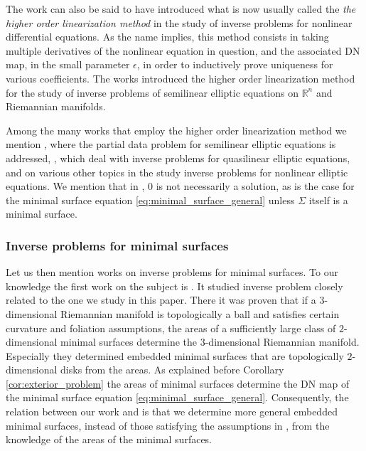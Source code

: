 \documentclass[12pt]{amsart}
\def\R{\mathbb R}
\theoremstyle{definition}
\theoremstyle{remark}
\begin{document}
The work \cite{kurylev2018inverse} can also be said to have introduced what is now usually called the \emph{the higher order linearization method} in the study of inverse problems for nonlinear differential equations. As the name implies, this method consists in taking multiple derivatives of the nonlinear equation in question, and the associated DN map, in the small parameter $\epsilon$, in order to inductively prove uniqueness for various coefficients. The works \cite{FO19,LLLS2019inverse, feizmohammadi2023inverse} introduced the higher order linearization method for the study of inverse problems of semilinear elliptic equations on $\R^n$ and Riemannian manifolds. 


Among the many works that employ the higher order linearization method we mention  \cite{MR4052205, LLLS2021b}, where the partial data problem for semilinear elliptic equations is addressed, \cite{CFKKU, kian2020partial, CaNaVa, Carstea2020, CaKa, CaFe1, CaFe2, CaGhNa, CaGhUh}, which deal with inverse problems for quasilinear elliptic equations, and \cite{lai2020partial, liimatainen2022inverse, liimatainen2022uniqueness, harrach2022simultaneous, salo2022inverse} on various other topics in the study inverse problems for nonlinear elliptic equations. We mention that in \cite{liimatainen2022uniqueness}, $0$ is not necessarily a solution, as is the case for the minimal surface equation \eqref{eq:minimal_surface_general} unless $\Sigma$ itself is a minimal surface.

\subsubsection{Inverse problems for minimal surfaces}
Let us then mention works on inverse problems for minimal surfaces. To our knowledge the first work on the subject is \cite{Tracey}. It studied inverse problem closely related to the one we study in this paper. There it was proven that if a $3$-dimensional Riemannian manifold is topologically a ball and satisfies certain curvature and foliation assumptions, the areas of a sufficiently large class of $2$-dimensional minimal surfaces determine the $3$-dimensional Riemannian manifold. Especially they determined embedded minimal surfaces that are topologically $2$-dimensional disks from the areas. As explained before Corollary \ref{cor:exterior_problem} the areas of minimal surfaces determine the DN map of the minimal surface equation \eqref{eq:minimal_surface_general}. Consequently, the relation between our work and \cite{Tracey} is that we determine more general embedded minimal surfaces, instead of those satisfying the assumptions in \cite{Tracey}, from the knowledge of the areas of the minimal surfaces. 
\end{document}

